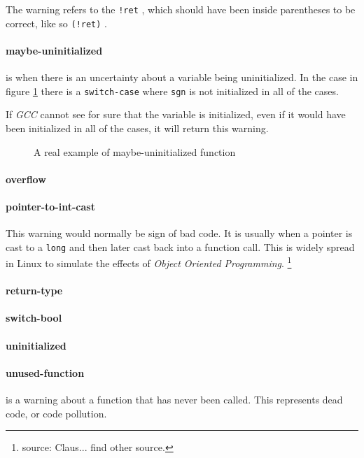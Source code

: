 \documentclass[a4paper,11pt]{report}
\newcommand{\textcode}[1]{
    \fboxsep=1pt
    \texttt{\colorbox{gray!20}{#1}}
}
\newcommand{\figa}{
    \begin{figure}[!htpb]
    \centering
}
\newcommand{\figb}[2]{
    \caption{#1}
    \label{#2}
    \end{figure}
}
\begin{document}
The warning refers to the \textcode{!ret}, which should have been inside 
parentheses to be correct, like so \textcode{(!ret)}.


            \paragraph{maybe-uninitialized}
is when there is an uncertainty about a variable being uninitialized. In the 
case in figure \ref{lst:maybeuninitializedreal} there is a 
\texttt{switch-case} where \texttt{sgn} is not initialized in all of the cases.

If \emph{GCC} cannot see for sure that the variable is initialized, 
even if it would have been initialized in all of the cases, it will return this 
warning.

\figa
    
\figb{A real example of maybe-uninitialized function}{lst:maybeuninitializedreal}


            \paragraph{overflow}


            \paragraph{pointer-to-int-cast}
            \label{par:pointertoint}
This warning would normally be sign of bad code. It is usually when a pointer 
is cast to a \texttt{long} and then later cast back into a function call. This 
is widely spread in Linux to simulate the effects of \emph{Object Oriented 
Programming}.
    \footnote{source: Claus... find other source.}


            \paragraph{return-type}
            \paragraph{switch-bool}
            \paragraph{uninitialized}
            \paragraph{unused-function}
is a warning about a function that has never been called. This represents dead 
code, or code pollution. 
\end{document}
